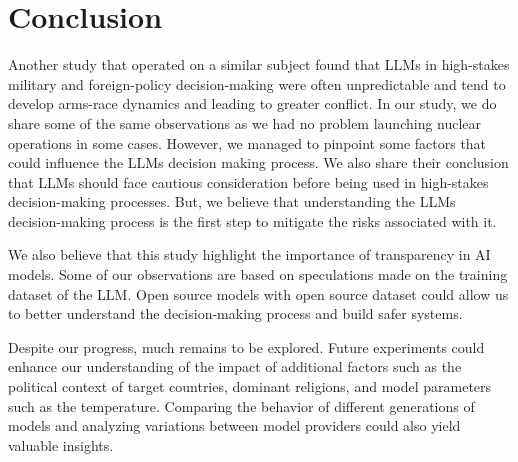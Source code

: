 \section{Conclusion}

Another study that operated on a similar subject found that LLMs in high-stakes military and foreign-policy decision-making were often unpredictable and tend to develop arms-race dynamics and leading to greater conflict\cite{Rivera_2024}. In our study, we do share some of the same observations as we had no problem launching nuclear operations in some cases. However, we managed to pinpoint some factors that could influence the LLMs decision making process. We also share their conclusion that LLMs should face cautious consideration before being used in high-stakes decision-making processes. But, we believe that understanding the LLMs decision-making process is the first step to mitigate the risks associated with it.

We also believe that this study highlight the importance of transparency in AI models. Some of our observations are based on speculations made on the training dataset of the LLM. Open source models with open source dataset could allow us to better understand the decision-making process and build safer systems.

Despite our progress, much remains to be explored. Future experiments could enhance our understanding of 
the impact of additional factors such as the political context of target countries,
 dominant religions, and model parameters such as the temperature.
  Comparing the behavior of different generations of models and analyzing 
  variations between model providers could also yield valuable insights.